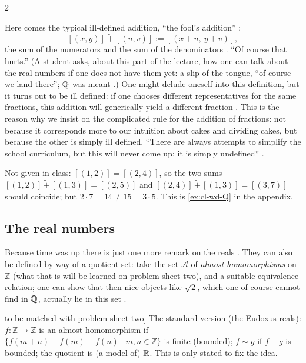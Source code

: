 \begin{paracol}{2}
\begin{remark}\label{rem:cl-fool}
Here comes the typical ill-defined addition, ``the fool's addition'' :
\[
  [(x,y)]\ \tilde+\ [(u,v)]:=[(x+u,\ y+v)],
\]
the sum of the numerators and the sum of the denominators . ``Of course that hurts.''
(A student asks, about this part of the lecture, how one can talk about the real numbers if one does not have them yet: a
slip of the tongue, ``of course we land there''; $\mathbb{Q}$ was meant .) One might delude oneself
into this definition, but it turns out to be ill defined: if one chooses different representatives for the same fractions, this
addition will generically yield a different fraction . This is the reason why we insist on
the complicated rule for the addition of fractions: not because it corresponds more to our intuition about cakes and dividing
cakes, but because the other is simply ill defined. ``There are always attempts to simplify the school curriculum, but this
will never come up: it is simply undefined'' .
\end{remark}
\begin{coursenote}
Not given in class: $[(1,2)]=[(2,4)]$, so the two sums $[(1,2)]\,\tilde+\,[(1,3)]=[(2,5)]$ and
$[(2,4)]\,\tilde+\,[(1,3)]=[(3,7)]$ should coincide; but $2\cdot7=14\ne15=3\cdot5$. This is
\cref{ex:cl-wd-Q} in the appendix.
\end{coursenote}

\subsection*{The real numbers}

Because time was up there is just one more remark on the reals . They can also be defined by way of a quotient
set: take the set $\mathcal A$ of \emph{almost homomorphisms} on $\mathbb Z$ (what that is will be learned on problem sheet two),
and a suitable equivalence relation; one can show that then nice objects like $\sqrt2$, which one of course cannot find in
$\mathbb{Q}$, actually lie in this set .
\begin{coursenote}[Almost homomorphisms: not said in class, [?] to be matched with problem sheet two]
The standard version (the Eudoxus reals): $f\colon\mathbb Z\to\mathbb Z$ is an almost homomorphism if
$\{f(m+n)-f(m)-f(n)\mid m,n\in\mathbb Z\}$ is finite (bounded); $f\sim g$ if $f-g$ is bounded; the quotient is
(a model of) $\mathbb{R}$. This is only stated to fix the idea.
\end{coursenote}


\end{paracol}
